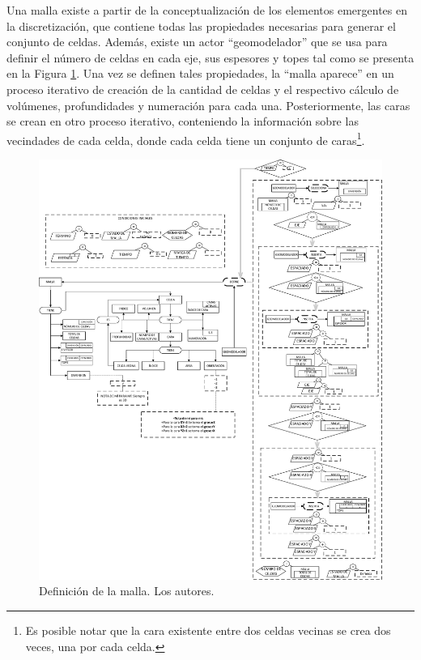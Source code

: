 Una malla existe a partir de la conceptualización de los elementos emergentes en la discretización, que contiene todas las propiedades necesarias para generar el conjunto de celdas. Además, existe un actor ``geomodelador'' que se usa para definir el número de celdas en cada eje, sus espesores y topes tal como se presenta en  la Figura \ref{fig:Mesh}. Una vez se definen tales propiedades, la ``malla aparece'' en un proceso iterativo de creación de la cantidad de celdas y el respectivo cálculo de volúmenes, profundidades y numeración para cada una. Posteriormente, las caras se crean en otro proceso iterativo, conteniendo la información sobre las vecindades de cada celda, donde cada celda tiene un conjunto de caras\footnote{Es posible notar que la cara existente entre dos celdas vecinas se crea dos veces, una por cada celda.}.\\

\begin{figure}[h]
	\centering%
	\includegraphics[width=\linewidth]{Fig/Mesh.pdf}%
	\caption[Definición de la malla.]{Definición de la malla. Los autores.} \label{fig:Mesh}
\end{figure}

